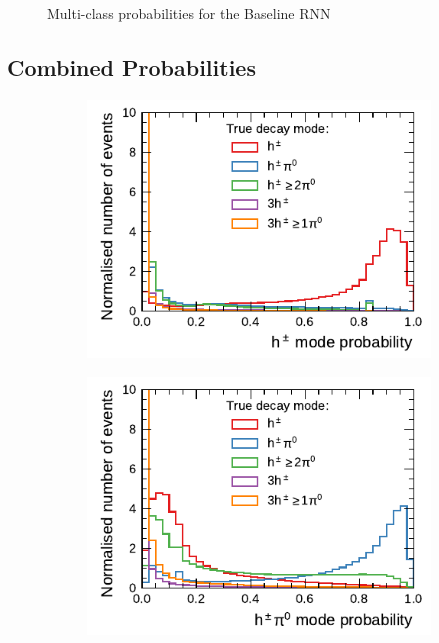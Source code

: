 \begin{figure}[!ht]
\begin{subfigure}{0.48\textwidth}
  \end{subfigure}%

  \caption{Multi-class probabilities for the Baseline RNN}
  \label{fig:rnn_multiclass_proba_baseline}
\end{figure}

\clearpage
\subsection{Combined Probabilities}
\label{app:combined_probabilities}

\begin{figure}[!ht]
  \begin{subfigure}{0.48\textwidth}
    \centering
    \includegraphics{./figures/decay_mode_classification/combined_proba/proba_1p0n.pdf}
  \end{subfigure}\hfill
  \begin{subfigure}{0.48\textwidth}
    \centering
    \includegraphics{./figures/decay_mode_classification/combined_proba/proba_1p1n.pdf}

\end{subfigure}
\end{figure}
